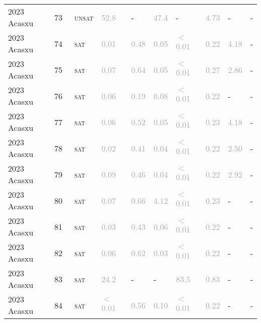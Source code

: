 \begin{center}
{\begin{longtable}{@{}llllllllll@{}}
2023 Acasxu & 73 & ~\textsc{unsat} & \textcolor{darkgray}{52.8} & - & \textcolor{darkgray}{47.4} & - & \textcolor{darkgray}{4.73} & - & - \\
2023 Acasxu & 74 & ~\textsc{sat} & \textcolor{darkgray}{0.01} & \textcolor{darkgray}{0.48} & \textcolor{darkgray}{0.05} & \textcolor{darkgray}{$<$0.01} & \textcolor{darkgray}{0.22} & \textcolor{darkgray}{4.18} & - \\
2023 Acasxu & 75 & ~\textsc{sat} & \textcolor{darkgray}{0.07} & \textcolor{darkgray}{0.64} & \textcolor{darkgray}{0.05} & \textcolor{darkgray}{$<$0.01} & \textcolor{darkgray}{0.27} & \textcolor{darkgray}{2.86} & - \\
2023 Acasxu & 76 & ~\textsc{sat} & \textcolor{darkgray}{0.06} & \textcolor{darkgray}{0.19} & \textcolor{darkgray}{0.08} & \textcolor{darkgray}{$<$0.01} & \textcolor{darkgray}{0.22} & - & - \\
2023 Acasxu & 77 & ~\textsc{sat} & \textcolor{darkgray}{0.06} & \textcolor{darkgray}{0.52} & \textcolor{darkgray}{0.05} & \textcolor{darkgray}{$<$0.01} & \textcolor{darkgray}{0.23} & \textcolor{darkgray}{4.18} & - \\
2023 Acasxu & 78 & ~\textsc{sat} & \textcolor{darkgray}{0.02} & \textcolor{darkgray}{0.41} & \textcolor{darkgray}{0.04} & \textcolor{darkgray}{$<$0.01} & \textcolor{darkgray}{0.22} & \textcolor{darkgray}{2.50} & - \\
2023 Acasxu & 79 & ~\textsc{sat} & \textcolor{darkgray}{0.09} & \textcolor{darkgray}{0.46} & \textcolor{darkgray}{0.04} & \textcolor{darkgray}{$<$0.01} & \textcolor{darkgray}{0.22} & \textcolor{darkgray}{2.92} & - \\
2023 Acasxu & 80 & ~\textsc{sat} & \textcolor{darkgray}{0.07} & \textcolor{darkgray}{0.66} & \textcolor{darkgray}{4.12} & \textcolor{darkgray}{$<$0.01} & \textcolor{darkgray}{0.23} & - & - \\
2023 Acasxu & 81 & ~\textsc{sat} & \textcolor{darkgray}{0.03} & \textcolor{darkgray}{0.43} & \textcolor{darkgray}{0.06} & \textcolor{darkgray}{$<$0.01} & \textcolor{darkgray}{0.22} & - & - \\
2023 Acasxu & 82 & ~\textsc{sat} & \textcolor{darkgray}{0.06} & \textcolor{darkgray}{0.62} & \textcolor{darkgray}{0.03} & \textcolor{darkgray}{$<$0.01} & \textcolor{darkgray}{0.22} & - & - \\
2023 Acasxu & 83 & ~\textsc{sat} & \textcolor{darkgray}{24.2} & - & - & \textcolor{darkgray}{83.5} & \textcolor{darkgray}{0.83} & - & - \\
2023 Acasxu & 84 & ~\textsc{sat} & \textcolor{darkgray}{$<$0.01} & \textcolor{darkgray}{0.56} & \textcolor{darkgray}{0.10} & \textcolor{darkgray}{$<$0.01} & \textcolor{darkgray}{0.22} & - & - \\

\end{longtable}}
\end{center}
